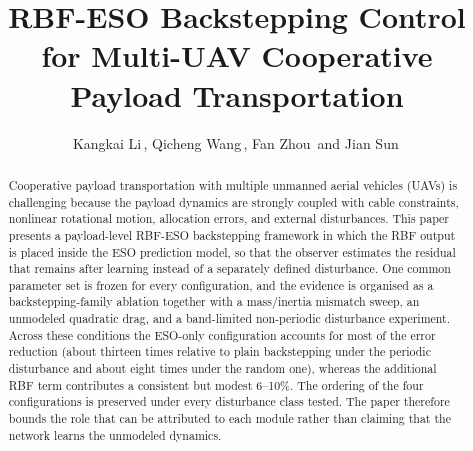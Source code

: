 \documentclass[Review,sageh,times]{sagej}
\begin{document}
\title{RBF-ESO Backstepping Control for Multi-UAV Cooperative Payload Transportation}

\author{
Kangkai Li\,,
Qicheng Wang\,,
Fan Zhou\, and
Jian Sun\,
}





\begin{abstract}
Cooperative payload transportation with multiple unmanned aerial
vehicles (UAVs) is challenging because the payload dynamics are
strongly coupled with cable constraints, nonlinear rotational motion,
allocation errors, and external disturbances. This paper presents a
payload-level RBF-ESO backstepping framework in which the RBF output is
placed inside the ESO prediction model, so that the observer estimates
the residual that remains after learning instead of a separately defined
disturbance. One common parameter set is frozen for every configuration,
and the evidence is organised as a backstepping-family ablation together
with a mass/inertia mismatch sweep, an unmodeled quadratic drag, and a
band-limited non-periodic disturbance experiment. Across these conditions
the ESO-only configuration accounts for most of the error reduction
(about thirteen times relative to plain backstepping under the periodic
disturbance and about eight times under the random one), whereas the
additional RBF term contributes a consistent but modest 6--10\%. The
ordering of the four configurations is preserved under every disturbance
class tested. The paper therefore bounds the role that can be attributed
to each module rather than claiming that the network learns the unmodeled
dynamics.
\end{abstract}


\def\startpage{2}
\def\volumeyear{2026}

\maketitle

\end{document}
